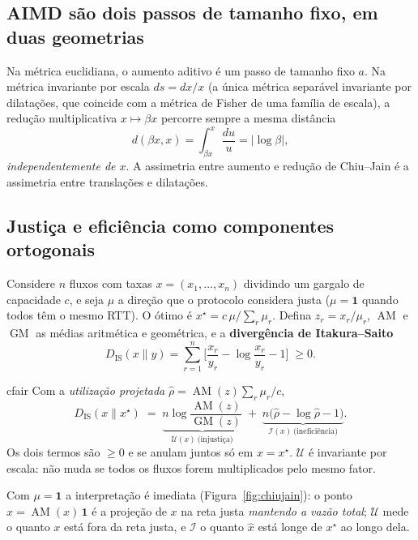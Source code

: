 \documentclass[11pt,a4paper]{article}
\newcommand{\AM}{\operatorname{AM}}
\newcommand{\GM}{\operatorname{GM}}
\newcommand{\Dis}{D_{\mathrm{IS}}}
\newcommand{\ones}{\mathbf{1}}
\begin{document}
\subsection{AIMD são dois passos de tamanho fixo, em duas geometrias}

Na métrica euclidiana, o aumento aditivo é um passo de tamanho fixo $a$. Na métrica
invariante por escala $ds=dx/x$ (a única métrica separável invariante por dilatações,
que coincide com a métrica de Fisher de uma família de escala), a redução
multiplicativa $x\mapsto\beta x$ percorre sempre a mesma distância
\[
d(\beta x,x)=\int_{\beta x}^x\frac{du}{u}=|\log\beta|,
\]
\emph{independentemente de $x$}. A assimetria entre aumento e redução de Chiu--Jain é
a assimetria entre translações e dilatações.

\subsection{Justiça e eficiência como componentes ortogonais}

Considere $n$ fluxos com taxas $x=(x_1,\dots,x_n)$ dividindo um gargalo de capacidade
$c$, e seja $\mu$ a direção que o protocolo considera justa ($\mu=\ones$ quando todos
têm o mesmo RTT). O ótimo é $x^\star=c\,\mu/\sum_r\mu_r$. Defina $z_r=x_r/\mu_r$,
$\AM$ e $\GM$ as médias aritmética e geométrica, e a \textbf{divergência de
Itakura--Saito}
\begin{equation}
\Dis(x\|y)=\sum_{r=1}^n\Big[\frac{x_r}{y_r}-\log\frac{x_r}{y_r}-1\Big]\;\ge0 .
\end{equation}

\begin{caixa}[title=Teorema (decomposição pitagórica)]{cfair}
Com a \emph{utilização projetada} $\hat\rho=\AM(z)\sum_r\mu_r/c$,
\begin{equation}
\Dis(x\|x^\star)\;=\;
\underbrace{n\log\frac{\AM(z)}{\GM(z)}}_{\textstyle\mathcal U(x)\ \text{(injustiça)}}
\;+\;
\underbrace{n\big(\hat\rho-\log\hat\rho-1\big)}_{\textstyle\mathcal I(x)\ \text{(ineficiência)}} .
\label{eq:pitagorasA}
\end{equation}
Os dois termos são $\ge0$ e se anulam juntos só em $x=x^\star$. $\mathcal U$ é
invariante por escala: não muda se todos os fluxos forem multiplicados pelo mesmo
fator.
\end{caixa}

Com $\mu=\ones$ a interpretação é imediata (Figura~\ref{fig:chiujain}): o ponto
$\hat x=\AM(x)\,\ones$ é a projeção de $x$ na reta justa \emph{mantendo a vazão total};
$\mathcal U$ mede o quanto $x$ está fora da reta justa, e $\mathcal I$ o quanto $\hat x$
está longe de $x^\star$ ao longo dela.
\end{document}
